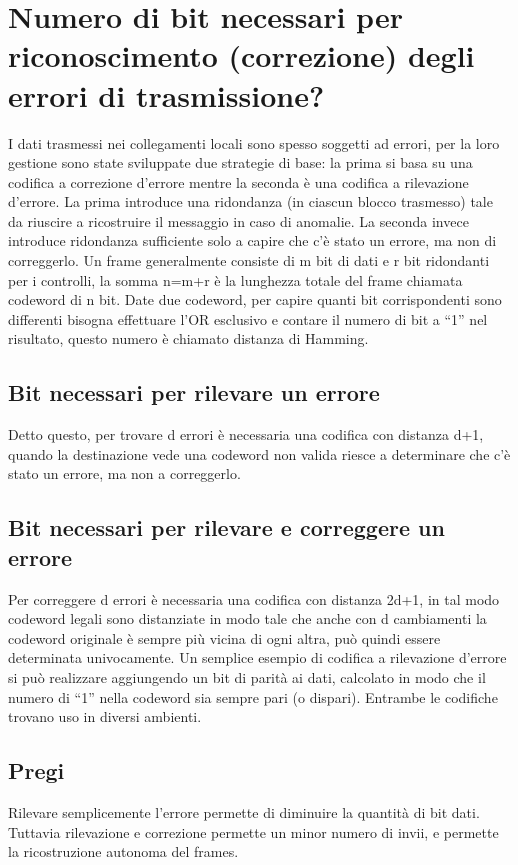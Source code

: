 \section{Numero di bit necessari per riconoscimento (correzione) degli errori di trasmissione?}

I dati trasmessi nei collegamenti locali sono spesso soggetti ad errori, per la loro gestione sono state sviluppate due strategie di base:
la prima si basa su una codifica a correzione d'errore mentre la seconda è una codifica a rilevazione d'errore.
La prima introduce una ridondanza (in ciascun blocco trasmesso) tale da riuscire a ricostruire il messaggio in caso di anomalie.
La seconda invece introduce ridondanza sufficiente solo a capire che c'è stato un errore, ma non di correggerlo.
Un frame generalmente consiste di m bit di dati e r bit ridondanti per i controlli, la somma n=m+r è la lunghezza totale del frame chiamata codeword di n bit.
Date due codeword, per capire quanti bit corrispondenti sono differenti bisogna effettuare l'OR esclusivo e contare il numero di bit a “1” nel risultato,
questo numero è chiamato distanza di Hamming.
\subsection{Bit necessari per rilevare un errore}
Detto questo, per trovare d errori è necessaria una codifica con distanza d+1,
quando la destinazione vede una codeword non valida riesce a determinare che c'è stato un errore, ma non a correggerlo.
\subsection{Bit necessari per rilevare e correggere un errore}
Per correggere d errori è necessaria una codifica con distanza 2d+1,
in tal modo codeword legali sono distanziate in modo tale che anche con d cambiamenti la codeword originale è sempre più vicina di ogni altra,
può quindi essere determinata univocamente.
Un semplice esempio di codifica a rilevazione d'errore si può realizzare aggiungendo un bit di parità ai dati,
calcolato in modo che il numero di “1” nella codeword sia sempre pari (o dispari).
Entrambe le codifiche trovano uso in diversi ambienti.

\subsection{Pregi}
Rilevare semplicemente l'errore permette di diminuire la quantità di bit dati.
Tuttavia rilevazione e correzione permette un minor numero di invii, e permette la ricostruzione autonoma del frames.

